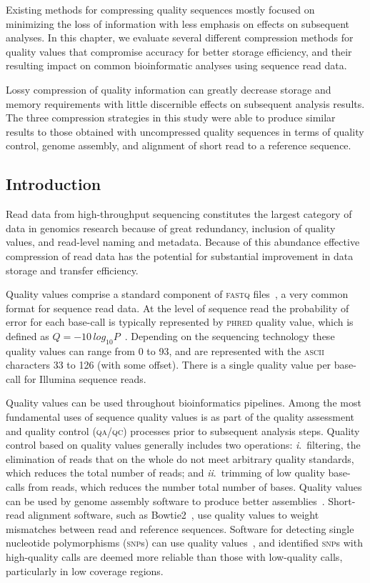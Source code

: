 \documentclass[12pt,\mydriver]{thesis}
\begin{document}
Existing methods for compressing quality sequences mostly focused on
minimizing the loss of information with less emphasis on effects on
subsequent analyses. In this chapter, we evaluate several different
compression methods for quality values that compromise accuracy for
better storage efficiency, and their resulting impact on common
bioinformatic analyses using sequence read data.

Lossy compression of quality information can greatly decrease storage
and memory requirements with little discernible effects on subsequent
analysis results. The three compression strategies in this study were
able to produce similar results to those obtained with uncompressed
quality sequences in terms of quality control, genome assembly, and
alignment of short read to a reference sequence.

\subsection{Introduction}

Read data from high-throughput sequencing constitutes the largest
category of data in genomics research because of great redundancy,
inclusion of quality values, and read-level naming and
metadata. Because of this abundance effective compression of read data
has the potential for substantial improvement in data storage and
transfer efficiency.

Quality values comprise a standard component of \textsc{fastq}
files~\cite{Cock:2010ve}, a very common format for sequence read
data. At the level of sequence read the probability of error for each
base-call is typically represented by \textsc{phred} quality value,
which is defined as $Q =
-10\,log_{10}P$~\cite{Ewing:1998ly}. Depending on the sequencing
technology these quality values can range from 0 to 93, and are
represented with the \textsc{ascii} characters 33 to 126 (with some
offset). There is a single quality value per base-call for Illumina
sequence reads.

Quality values can be used throughout bioinformatics pipelines. Among
the most fundamental uses of sequence quality values is as part of the
quality assessment and quality control (\textsc{qa/qc}) processes
prior to subsequent analysis steps. Quality control based on quality
values generally includes two operations: \textit{i}.~filtering, the
elimination of reads that on the whole do not meet arbitrary quality
standards, which reduces the total number of reads; and
\textit{ii}.~trimming of low quality base-calls from reads, which
reduces the number total number of bases. Quality values can be used
by genome assembly software to produce better
assemblies~\cite{Bryant:2009uq,Gnerre:2011kx}. Short-read
alignment software, such as Bowtie2~\cite{langmead2012fast}, use
quality values to weight mismatches between read and reference
sequences. Software for detecting single nucleotide polymorphisms
(\textsc{snp}s) can use quality values~\cite{McKenna:2010bh},
and identified \textsc{snp}s with high-quality calls are deemed more
reliable than those with low-quality calls, particularly in low
coverage regions.
\end{document}
